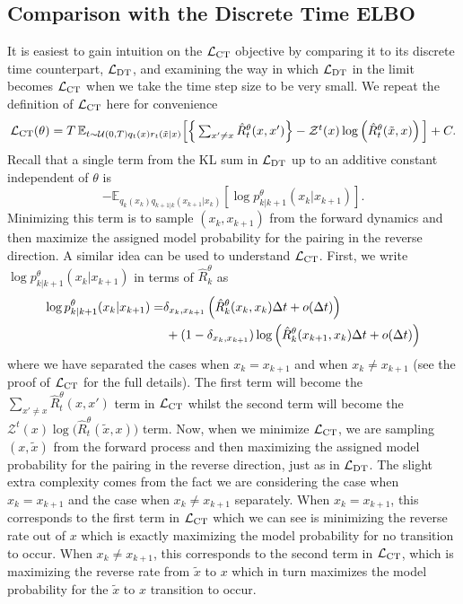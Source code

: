 \documentclass{article}
\begin{document}
\subsection{Comparison with the Discrete Time ELBO} \label{sec:ApdxCTDTELBOComparison}
It is easiest to gain intuition on the $\mathcal{L}_{\textup{CT}}$ objective by comparing it to its discrete time counterpart, $\mathcal{L}_{\textup{DT}}$, and examining the way in which $\mathcal{L}_{\textup{DT}}$ in the limit becomes $\mathcal{L}_{\textup{CT}}$ when we take the time step size to be very small. We repeat the definition of $\mathcal{L}_{\textup{CT}}$ here for convenience
\begin{equation}
   \textstyle \mathcal{L}_{\textup{CT}}(\theta) = T \, \mathbb{E}_{t\sim \mathcal{U}(0, T) q_t(x) r_t(\tilde{x}|x)} \Big[ \Big\{ \sum_{x' \neq x} \hat{R}_t^\theta(x, x') \Big\} - \mathcal{Z}^t(x) \log \left(\hat{R}_t^\theta(\tilde{x}, x) \right) \Big] + C.
\end{equation}
Recall that a single term from the KL sum in $\mathcal{L}_{\textup{DT}}$ up to an additive constant independent of $\theta$ is
\begin{equation}
  \textstyle -\mathbb{E}_{q_k(x_k) q_{k+1|k}(x_{k+1} | x_k)} \left[ \log p_{k|k+1}^\theta(x_k|x_{k+1})\right].
\end{equation}
Minimizing this term is to sample $(x_k , x_{k+1})$ from the forward dynamics and then maximize the assigned model probability for the pairing in the reverse direction. A similar idea can be used to understand $\mathcal{L}_{\textup{CT}}$. First, we write $\log p_{k|k+1}^\theta(x_k | x_{k+1})$ in terms of $\hat{R}_k^\theta$ as
\begin{align}
    \log p_{k|k+1}^\theta(x_k | x_{k+1}) =& \delta_{x_k, x_{k+1}} \left( \hat{R}_k^\theta(x_k, x_k) \Delta t + o(\Delta t)  \right)\\
    & \, + ( 1 - \delta_{x_k, x_{k+1}} ) \log \left( \hat{R}_k^\theta(x_{k+1}, x_k) \Delta t + o(\Delta t) \right)
\end{align}
where we have separated the cases when $x_k = x_{k+1}$ and when $x_k \neq x_{k+1}$ (see the proof of $\mathcal{L}_{\textup{CT}}$ for the full details). The first term will become the $\sum_{x' \neq x} \hat{R}_t^\theta(x, x')$ term in $\mathcal{L}_{\textup{CT}}$ whilst the second term will become the $\mathcal{Z}^t(x) \log \big( \hat{R}_t^\theta(\tilde{x}, x) \big)$ term. Now, when we minimize $\mathcal{L}_{\textup{CT}}$, we are sampling $(x, \tilde{x})$ from the forward process and then maximizing the assigned model probability for the pairing in the reverse direction, just as in $\mathcal{L}_{\textup{DT}}$. The slight extra complexity comes from the fact we are considering the case when $x_k = x_{k+1}$ and the case when $x_k \neq x_{k+1}$ separately. When $x_k = x_{k+1}$, this corresponds to the first term in $\mathcal{L}_{\textup{CT}}$ which we can see is minimizing the reverse rate out of $x$ which is exactly maximizing the model probability for no transition to occur. When $x_k \neq x_{k+1}$, this corresponds to the second term in $\mathcal{L}_{\textup{CT}}$, which is maximizing the reverse rate from $\tilde{x}$ to $x$ which in turn maximizes the model probability for the $\tilde{x}$ to $x$ transition to occur.
\end{document}
